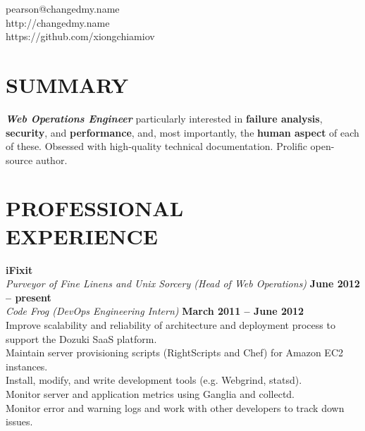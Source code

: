 \documentclass[margin,line]{resume}
\begin{document}
{
    \sc
    \hfill pearson@changedmy.name           \vspace{0mm}\\\vspace{0mm}%
    \hfill http://changedmy.name            \vspace{0mm}\\\vspace{0mm}%
    \hfill https://github.com/xiongchiamiov \vspace{0mm}\\\vspace{-9mm}%
}

\begin{resume}

\vspace{6mm}

    \section{\mysidestyle \textbf{\large{S}\small{UMMARY}}}

    \textbf{\textsl{Web Operations Engineer}} particularly interested in \textbf{failure analysis}, \textbf{security}, and \textbf{performance}, and, most importantly, the \textbf{human aspect} of each of these.  Obsessed with high-quality technical documentation.  Prolific open-source author.

\sectionline

    \section{\mysidestyle \textbf{\large{P}\small{ROFESSIONAL\\EXPERIENCE}}}

    \textbf{\listing iFixit} \vspace{2mm}\\\vspace{1mm}%
    \textsl{Purveyor of Fine Linens and Unix Sorcery (Head of Web Operations)} \hfill \textbf{June 2012 -- present}\\
    \textsl{Code Frog (DevOps Engineering Intern)} \hfill \textbf{March 2011 -- June 2012}\\
    Improve scalability and reliability of architecture and deployment process to support the Dozuki SaaS platform.\\
    Maintain server provisioning scripts (RightScripts and Chef) for Amazon EC2 instances.\\
    Install, modify, and write development tools (e.g. Webgrind, statsd).\\
    Monitor server and application metrics using Ganglia and collectd.\\
    Monitor error and warning logs and work with other developers to track down issues.


\end{resume}
\end{document}

